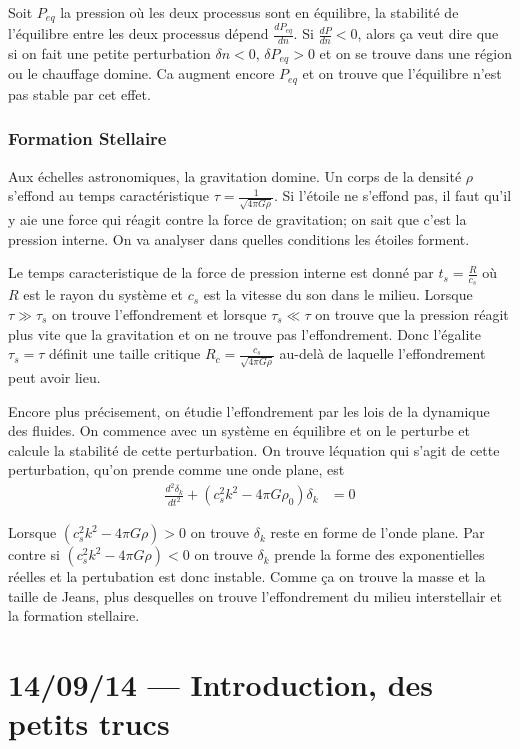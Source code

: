 \documentclass[10pt]{report}
\newcommand{\rd}[2]{\frac{d#1}{d#2}}
\newcommand{\rtd}[2]{\frac{d^2#1}{d#2^2}}
\begin{document}
Soit $P_{eq}$ la pression o\`u les deux processus sont en \'equilibre, la stabilit\'e de l'\'equilibre entre les deux processus d\'epend $\rd{P_{eq}}{n}$. Si $\rd{P}{n} < 0$, alors \c{c}a veut dire que si on fait une petite perturbation $\delta n < 0$, $\delta P_{eq} > 0$ et on se trouve dans une r\'egion ou le chauffage domine. Ca augment encore $P_{eq}$ et on trouve que l'\'equilibre n'est pas stable par cet effet.

\subsection{Formation Stellaire}

Aux \'echelles astronomiques, la gravitation domine. Un corps de la densit\'e $\rho$ s'effond au temps caract\'eristique $\tau = \frac{1}{\sqrt{4\pi G\rho}}$. Si l'\'etoile ne s'effond pas, il faut qu'il y aie une force qui r\'eagit contre la force de gravitation; on sait que c'est la pression interne. On va analyser dans quelles conditions les \'etoiles forment.

Le temps caracteristique de la force de pression interne est donn\'e par $t_s = \frac{R}{c_s}$ o\`u $R$ est le rayon du syst\`eme et $c_s$ est la vitesse du son dans le milieu. Lorsque $\tau \gg \tau_s$ on trouve l'effondrement et lorsque $\tau_s \ll \tau$ on trouve que la pression r\'eagit plus vite que la gravitation et on ne trouve pas l'effondrement. Donc l'\'egalite $\tau_s = \tau$ d\'efinit une taille critique $R_c = \frac{c_s}{\sqrt{4\pi G\rho}}$ au-del\`a de laquelle l'effondrement peut avoir lieu.

Encore plus pr\'ecisement, on \'etudie l'effondrement par les lois de la dynamique des fluides. On commence avec un syst\`eme en \'equilibre et on le perturbe et calcule la stabilit\'e de cette perturbation. On trouve l\'equation qui s'agit de cette perturbation, qu'on prende comme une onde plane, est
\begin{align}
    \rtd{\delta_k}{t} + \left( c_s^2k^2 - 4\pi G\rho_0 \right)\delta_k &= 0
\end{align}

Lorsque $\left( c_s^2k^2 - 4\pi G\rho \right) > 0$ on trouve $\delta_k$ reste en forme de l'onde plane. Par contre si $\left( c_s^2k^2 - 4\pi G\rho \right)< 0$ on trouve $\delta_k$ prende la forme des exponentielles r\'eelles et la pertubation est donc instable. Comme \c{c}a on trouve la masse et la taille de Jeans, plus desquelles on trouve l'effondrement du milieu interstellair et la formation stellaire.
\chapter{14/09/14 --- Introduction, des petits trucs} 
\end{document}
